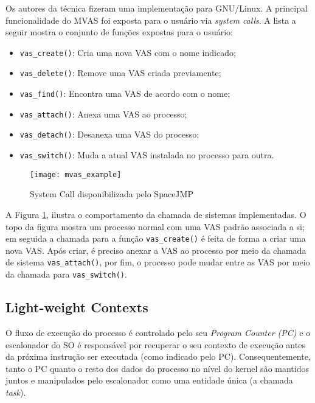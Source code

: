 Os autores da técnica fizeram uma implementação para GNU/Linux. A principal
funcionalidade do MVAS foi exposta para o usuário via \emph{system calls}. A
lista a seguir mostra o conjunto de funções expostas para o usuário:

\begin{itemize}
  \item \texttt{vas\_create()}: Cria uma nova VAS com o nome indicado;
  \item \texttt{vas\_delete()}: Remove uma VAS criada previamente;
  \item \texttt{vas\_find()}: Encontra uma VAS de acordo com o nome;
  \item \texttt{vas\_attach()}: Anexa uma VAS ao processo;
  \item \texttt{vas\_detach()}: Desanexa uma VAS do processo;
  \item \texttt{vas\_switch()}: Muda a atual VAS instalada no processo para outra.
\end{itemize}

\begin{figure}[!h]
  \centering
  \texttt{[image: mvas\_example]} 
  \caption{System Call disponibilizada pelo SpaceJMP \cite{ellarge}}
  \label{fig:mvas_example}
\end{figure}

A Figura \ref{fig:mvas_example}, ilustra o comportamento da chamada de sistemas
implementadas. O topo da figura mostra um processo normal com uma VAS padrão
associada a si; em seguida a chamada para a função \texttt{vas\_create()} é
feita de forma a criar uma nova VAS. Após criar, é preciso anexar a VAS ao
processo por meio da chamada de sistema \texttt{vas\_attach()}, por fim, o
processo pode mudar entre as VAS por meio da chamada para
\texttt{vas\_switch()}.

\subsection{Light-weight Contexts}

O fluxo de execução do processo é controlado pelo seu \emph{Program Counter
(PC)} e o escalonador do SO é responsável por recuperar o seu contexto de
execução antes da próxima instrução ser executada (como indicado pelo PC).
Consequentemente, tanto o PC quanto o resto dos dados do processo no nível do
kernel são mantidos juntos e manipulados pelo escalonador como uma entidade
única (a chamada \emph{task}).

